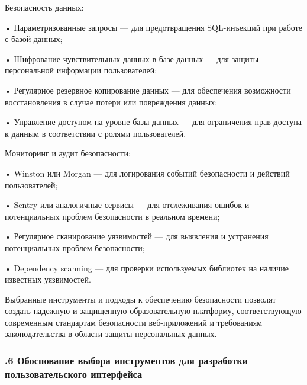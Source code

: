 {  \par \redline Безопасность данных:

  \par \redline • Параметризованные запросы — для предотвращения SQL-инъекций при работе с базой данных;
  \par \redline • Шифрование чувствительных данных в базе данных — для защиты персональной информации пользователей;
  \par \redline • Регулярное резервное копирование данных — для обеспечения возможности восстановления в случае потери или повреждения данных;
  \par \redline • Управление доступом на уровне базы данных — для ограничения прав доступа к данным в соответствии с ролями пользователей.

  \par \redline Мониторинг и аудит безопасности:

  \par \redline • Winston или Morgan — для логирования событий безопасности и действий пользователей;
  \par \redline • Sentry или аналогичные сервисы — для отслеживания ошибок и потенциальных проблем безопасности в реальном времени;
  \par \redline • Регулярное сканирование уязвимостей — для выявления и устранения потенциальных проблем безопасности;
  \par \redline • Dependency scanning — для проверки используемых библиотек на наличие известных уязвимостей.

  \par \redline Выбранные инструменты и подходы к обеспечению безопасности позволят создать надежную и защищенную образовательную платформу, соответствующую современным стандартам безопасности веб-приложений и требованиям законодательства в области защиты персональных данных.

  \par
}

\subtitlespace

\subsubsection*{ 
  \gostTitleFont
  .6 Обоснование выбора инструментов для разработки пользовательского интерфейса
} 

\subtitlespace

